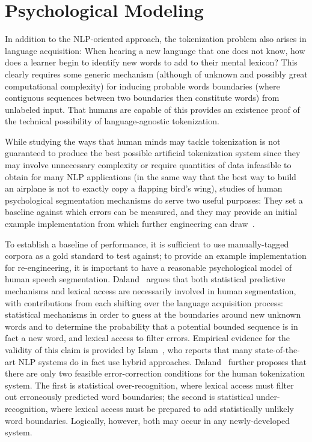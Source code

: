 \section{Psychological Modeling}

In addition to the NLP-oriented approach, the tokenization problem also arises in language acquisition: When hearing a new language that one does not know, how does a learner begin to identify new words to add to their mental lexicon? This clearly requires some generic mechanism (although of unknown and possibly great computational complexity) for inducing probable words boundaries (where contiguous sequences between two boundaries then constitute words) from unlabeled input. That humans are capable of this provides an existence proof of the technical possibility of language-agnostic tokenization.

While studying the ways that human minds may tackle tokenization is not guaranteed to produce the best possible artificial tokenization system since they may involve unnecessary complexity or require quantities of data infeasible to obtain for many NLP applications (in the same way that the best way to build an airplane is not to exactly copy a flapping bird's wing), studies of human psychological segmentation mechanisms do serve two useful purposes: They set a baseline against which errors can be measured, and they may provide an initial example implementation from which further engineering can draw~\cite{daland09}.

To establish a baseline of performance, it is sufficient to use manually-tagged corpora as a gold standard to test against; to provide an example implementation for re-engineering, it is important to have a reasonable psychological model of human speech segmentation. Daland~\cite{daland09} argues that both statistical predictive mechanisms and lexical access are necessarily involved in human segmentation, with contributions from each shifting over the language acquisition process: statistical mechanisms in order to guess at the boundaries around new unknown words and to determine the probability that a potential bounded sequence is in fact a new word, and lexical access to filter errors. Empirical evidence for the validity of this claim is provided by Islam~\cite{islam07}, who reports that many state-of-the-art NLP systems do in fact use hybrid approaches. Daland~\cite{daland09} further proposes that there are only two feasible error-correction conditions for the human tokenization system. The first is statistical over-recognition, where lexical access must filter out erroneously predicted word boundaries; the second is statistical under-recognition, where lexical access must be prepared to add statistically unlikely word boundaries. Logically, however, both may occur in any newly-developed system.

